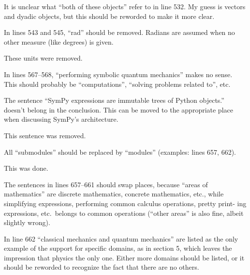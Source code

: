 \documentclass[answers,12pt]{exam}
\begin{document}
\begin{questions}
\question It is unclear what ``both of these objects'' refer to in line 532. My guess is vectors and dyadic objects, but this should be reworded to make it more clear.
\begin{solution}

\end{solution}

\question In lines 543 and 545, ``rad'' should be removed. Radians are assumed when no other measure (like degrees) is given.
\begin{solution}
These units were removed.
\end{solution}

\question In lines 567--568, ``performing symbolic quantum mechanics'' makes no sense. This should probably be ``computations'', ``solving problems related to'', etc.
\begin{solution}

\end{solution}

\question The sentence ``SymPy expressions are immutable trees of Python objects.'' doesn't belong in the conclusion. This can be moved to the appropriate place when discussing SymPy's architecture.
\begin{solution}
This sentence was removed.
\end{solution}

\question All ``submodules'' should be replaced by ``modules'' (examples: lines 657, 662).
\begin{solution}
This was done.
\end{solution}

\question The sentences in lines 657--661 should swap places, because ``areas of mathematics'' are discrete mathematics, concrete mathematics, etc., while simplifying expressions, performing common calculus operations, pretty print- ing expressions, etc.\ belongs to common operations (``other areas'' is also fine, albeit slightly wrong).
\begin{solution}

\end{solution}

\question In line 662 ``classical mechanics and quantum mechanics'' are listed as the only example of the support for specific domains, as in section 5, which leaves the impression that physics the only one. Either more domains should be listed, or it should be reworded to recognize the fact that there are no others.
\begin{solution}


\end{solution}
\end{questions}
\end{document}

